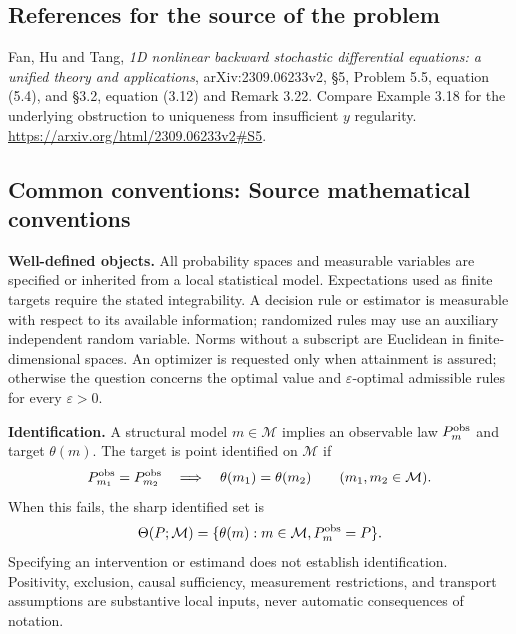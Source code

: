 \documentclass[11pt,a4paper]{article}
\begin{document}
\subsection*{References for the source of the problem}
Fan, Hu and Tang, \emph{1D nonlinear backward stochastic differential
equations: a unified theory and applications}, arXiv:2309.06233v2,
\S5, Problem 5.5, equation (5.4), and \S3.2, equation (3.12) and
Remark 3.22. Compare Example 3.18 for the underlying obstruction to
uniqueness from insufficient $y$ regularity.
\url{https://arxiv.org/html/2309.06233v2#S5}.

\subsection*{Common conventions: Source mathematical conventions}

\textbf{Well-defined objects.}
All probability spaces and measurable variables are specified or inherited
from a local statistical model. Expectations used as finite targets require
the stated integrability. A decision rule or estimator is measurable with
respect to its available information; randomized rules may use an auxiliary
independent random variable. Norms without a subscript are Euclidean in
finite-dimensional spaces. An optimizer is requested only when attainment
is assured; otherwise the question concerns the optimal value and
$\varepsilon$-optimal admissible rules for every $\varepsilon>0$.

\textbf{Identification.}
A structural model $m\in\mathcal M$ implies an observable law
$P_m^{\rm obs}$ and target $\theta(m)$. The target is point identified on
$\mathcal M$ if
\[
 P_{m_1}^{\rm obs}=P_{m_2}^{\rm obs}
 \quad\Longrightarrow\quad\theta(m_1)=\theta(m_2)
 \qquad(m_1,m_2\in\mathcal M).
\]
When this fails, the sharp identified set is
\[
 \Theta(P;\mathcal M)=\{\theta(m):m\in\mathcal M,
                                  P_m^{\rm obs}=P\}.
\]
Specifying an intervention or estimand does not establish identification.
Positivity, exclusion, causal sufficiency, measurement restrictions, and
transport assumptions are substantive local inputs, never automatic
consequences of notation.
\end{document}
